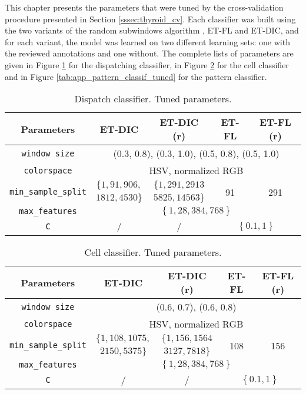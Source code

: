 \label{app:parameters}

This chapter presents the parameters that were tuned by the cross-validation procedure presented in Section \ref{sssec:thyroid_cv}. Each classifier was built using the two variants of the random subwindows algorithm , ET-FL and ET-DIC, and for each variant, the model was learned on two different learning sets: one with the reviewed annotations and one without. The complete lists of parameters are given in Figure \ref{tab:app_disp_classif_tuned} for the dispatching classifier, in Figure \ref{tab:app_cell_classif_tuned} for the cell classifier and in Figure \ref{tab:app_pattern_classif_tuned} for the pattern classifier.

\begin{table}
	\center 
	\begin{tabular}{|c|cccc|}
		\hline
		Parameters & ET-DIC & ET-DIC (r) & ET-FL & ET-FL (r) \\
		\hline		
		\texttt{window size} & \multicolumn{4}{|c|}{(0.3, 0.8), (0.3, 1.0), (0.5, 0.8), (0.5, 1.0)} \\
		\texttt{colorspace} & \multicolumn{4}{|c|}{HSV, normalized RGB} \\
		\multirow{2}{*}{\texttt{min\_sample\_split}} & $\{1, 91, 906,$ &  $\{1, 291, 2913$ & \multirow{2}{*}{91} & \multirow{2}{*}{291}\\
		& $1812, 4530\}$ & $5825, 14563 \}$ & & \\
		\texttt{max\_features} & \multicolumn{4}{|c|}{$\left\{1, 28, 384, 768\right\}$}\\ 
		\texttt{C} & / & / & \multicolumn{2}{c|}{$\left\{0.1, 1\right\}$}\\
		\hline
	\end{tabular}
	\caption{Dispatch classifier. Tuned parameters.}
	\label{tab:app_disp_classif_tuned}
\end{table}

\begin{table}
	\center 
	\begin{tabular}{|c|cccc|}
		\hline
		Parameters & ET-DIC & ET-DIC (r) & ET-FL & ET-FL (r) \\
		\hline		
		\texttt{window size} & \multicolumn{4}{|c|}{(0.6, 0.7), (0.6, 0.8)} \\
		\texttt{colorspace} & \multicolumn{4}{|c|}{HSV, normalized RGB} \\
		\multirow{2}{*}{\texttt{min\_sample\_split}} & $\{1, 108, 1075,$ &  $\{1, 156, 1564$ & \multirow{2}{*}{108} & \multirow{2}{*}{156}\\
		& $2150, 5375\}$ & $3127, 7818 \}$ & & \\
		\texttt{max\_features} & \multicolumn{4}{|c|}{$\left\{1, 28, 384, 768\right\}$}\\ 
		\texttt{C} & / & / & \multicolumn{2}{c|}{$\left\{0.1, 1\right\}$}\\
		\hline
	\end{tabular}
	\caption{Cell classifier. Tuned parameters.}
	\label{tab:app_cell_classif_tuned}
\end{table}


